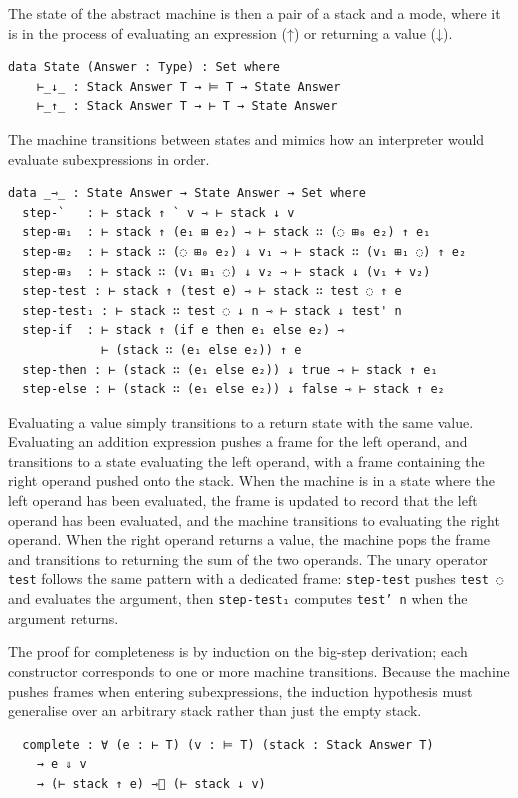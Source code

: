 The state of the abstract machine is then a pair of a stack and a mode, where it is in the process of evaluating an expression (↑) or returning a value (↓).

\begin{verbatim}
data State (Answer : Type) : Set where
    ⊢_↓_ : Stack Answer T → ⊨ T → State Answer
    ⊢_↑_ : Stack Answer T → ⊢ T → State Answer
\end{verbatim}


The machine transitions between states and mimics how an interpreter would evaluate subexpressions in order.
\begin{verbatim}
data _⇾_ : State Answer → State Answer → Set where
  step-`   : ⊢ stack ↑ ` v ⇾ ⊢ stack ↓ v
  step-⊞₁  : ⊢ stack ↑ (e₁ ⊞ e₂) ⇾ ⊢ stack ∷ (◌ ⊞₀ e₂) ↑ e₁
  step-⊞₂  : ⊢ stack ∷ (◌ ⊞₀ e₂) ↓ v₁ ⇾ ⊢ stack ∷ (v₁ ⊞₁ ◌) ↑ e₂
  step-⊞₃  : ⊢ stack ∷ (v₁ ⊞₁ ◌) ↓ v₂ ⇾ ⊢ stack ↓ (v₁ + v₂)
  step-test : ⊢ stack ↑ (test e) ⇾ ⊢ stack ∷ test ◌ ↑ e
  step-test₁ : ⊢ stack ∷ test ◌ ↓ n ⇾ ⊢ stack ↓ test' n
  step-𝚒𝚏  : ⊢ stack ↑ (if e then e₁ else e₂) ⇾ 
             ⊢ (stack ∷ (e₁ 𝚎𝚕𝚜𝚎 e₂)) ↑ e
  step-𝚝𝚑𝚎𝚗 : ⊢ (stack ∷ (e₁ 𝚎𝚕𝚜𝚎 e₂)) ↓ true ⇾ ⊢ stack ↑ e₁
  step-𝚎𝚕𝚜𝚎 : ⊢ (stack ∷ (e₁ 𝚎𝚕𝚜𝚎 e₂)) ↓ false ⇾ ⊢ stack ↑ e₂
\end{verbatim}

Evaluating a value simply transitions to a return state with the same value.
Evaluating an addition expression pushes a frame for the left operand, and transitions to a state evaluating the left operand, with a frame containing the right operand pushed onto the stack.
When the machine is in a state where the left operand has been evaluated, the frame is updated to record that the left operand has been evaluated, and the machine transitions to evaluating the right operand.
When the right operand returns a value, the machine pops the frame and transitions to returning the sum of the two operands.
The unary operator \texttt{test} follows the same pattern with a dedicated frame:
\texttt{step-test} pushes \texttt{test ◌} and evaluates the argument, then
\texttt{step-test₁} computes \texttt{test' n} when the argument returns.

The proof for completeness is by induction on the big-step derivation; each constructor corresponds to one or more machine transitions.
Because the machine pushes frames when entering subexpressions, the induction hypothesis must generalise over an arbitrary stack rather than just the empty stack.
\begin{verbatim}
  complete : ∀ (e : ⊢ T) (v : ⊨ T) (stack : Stack Answer T)
    → e ⇓ v
    → (⊢ stack ↑ e) ⇾⃰ (⊢ stack ↓ v)
\end{verbatim}

